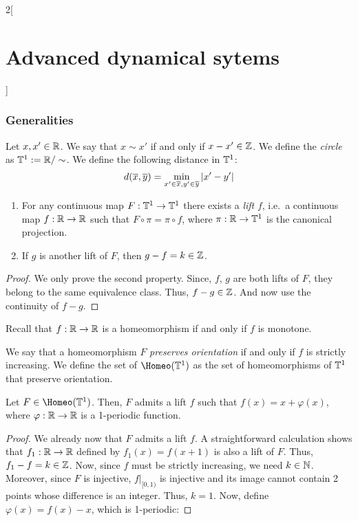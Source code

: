 \documentclass[../../../main_math.tex]{subfiles}
\begin{document}
\begin{multicols}{2}[\section{Advanced dynamical sytems}]
  \subsubsection{Generalities}
  \begin{definition}
    Let $x,x'\in\mathbb{R}$. We say that $x\sim x'$ if and only if $x-x'\in\mathbb{Z}$. We define the \emph{circle} as $\TT^1:=\quot{\RR}{\sim}$. We define the following distance in $\mathbb{T}^1$:
    $$
      d(\overline{x},\overline{y})=\min_{x'\in\overline{x},y'\in\overline{y}}\abs{x'-y'}
    $$
  \end{definition}
  \begin{proposition}\hfill
    \begin{enumerate}
      \item For any continuous map $F:\mathbb{T}^1\to \mathbb{T}^1$ there exists a \emph{lift} $f$, i.e.\ a continuous map $f:\mathbb{R}\to \mathbb{R}$ such that $F\circ \pi=\pi\circ f$, where $\pi:\mathbb{R}\to \mathbb{T}^1$ is the canonical projection.
      \item If $g$ is another lift of $F$, then $g-f=k\in\mathbb{Z}$.
    \end{enumerate}
  \end{proposition}
  \begin{proof}
    We only prove the second property. Since, $f$, $g$ are both lifts of $F$, they belong to the same equivalence class. Thus, $f-g\in\mathbb{Z}$. And now use the continuity of $f-g$.
  \end{proof}
  \begin{remark}
    Recall that $f:\mathbb{R}\to\mathbb{R}$ is a homeomorphism if and only if $f$ is monotone.
  \end{remark}
  \begin{definition}
    We say that a homeomorphism $F$ \emph{preserves orientation} if and only if $f$ is strictly increasing. We define the set of $\Homeo(\TT^1)$ as the set of homeomorphisms of $\mathbb{T}^1$ that preserve orientation.
  \end{definition}
  \begin{proposition}
    Let $F\in\Homeo(\TT^1)$. Then, $F$ admits a lift $f$ such that $f(x)=x+\varphi(x)$, where $\varphi:\mathbb{R}\to\mathbb{R}$ is a 1-periodic function.
  \end{proposition}
  \begin{proof}
    We already now that $F$ admits a lift $f$. A straightforward calculation shows that $f_1:\mathbb{R}\to\mathbb{R}$ defined by $f_1(x)=f(x+1)$ is also a lift of $F$. Thus, $f_1-f=k\in \mathbb{Z}$. Now, since $f$ must be strictly increasing, we need $k\in \mathbb{N}$. Moreover, since $F$ is injective, $f|_{[0,1)}$ is injective and its image cannot contain 2 points whose difference is an integer. Thus, $k=1$. Now, define $\varphi(x)=f(x)-x$, which is 1-periodic:

\end{proof}
\end{multicols}
\end{document}
